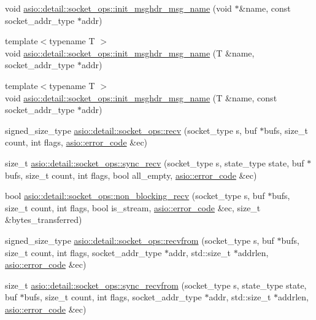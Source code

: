 \begin{DoxyCompactItemize}
\item 
void \hyperlink{namespaceasio_1_1detail_1_1socket__ops_a5ac22aed954e61ebb26ec23e2b3a8e2a}{asio\+::detail\+::socket\+\_\+ops\+::init\+\_\+msghdr\+\_\+msg\+\_\+name} (void $\ast$\&name, const socket\+\_\+addr\+\_\+type $\ast$addr)
\item 
{\footnotesize template$<$typename T $>$ }\\void \hyperlink{namespaceasio_1_1detail_1_1socket__ops_a329d55c68d029e6d969b44477af1be17}{asio\+::detail\+::socket\+\_\+ops\+::init\+\_\+msghdr\+\_\+msg\+\_\+name} (T \&name, socket\+\_\+addr\+\_\+type $\ast$addr)
\item 
{\footnotesize template$<$typename T $>$ }\\void \hyperlink{namespaceasio_1_1detail_1_1socket__ops_a8a41f252aeeef9953d7d8778a805a7f4}{asio\+::detail\+::socket\+\_\+ops\+::init\+\_\+msghdr\+\_\+msg\+\_\+name} (T \&name, const socket\+\_\+addr\+\_\+type $\ast$addr)
\item 
signed\+\_\+size\+\_\+type \hyperlink{namespaceasio_1_1detail_1_1socket__ops_a6a6d856ecb3a3c20a7a92142a0ba9390}{asio\+::detail\+::socket\+\_\+ops\+::recv} (socket\+\_\+type s, buf $\ast$bufs, size\+\_\+t count, int flags, \hyperlink{classasio_1_1error__code}{asio\+::error\+\_\+code} \&ec)
\item 
size\+\_\+t \hyperlink{namespaceasio_1_1detail_1_1socket__ops_a0af2a4601b674348ed084aeb22bc21b1}{asio\+::detail\+::socket\+\_\+ops\+::sync\+\_\+recv} (socket\+\_\+type s, state\+\_\+type state, buf $\ast$bufs, size\+\_\+t count, int flags, bool all\+\_\+empty, \hyperlink{classasio_1_1error__code}{asio\+::error\+\_\+code} \&ec)
\item 
bool \hyperlink{namespaceasio_1_1detail_1_1socket__ops_a185dd0a82b9c2a0dad4b7885b3ceda5f}{asio\+::detail\+::socket\+\_\+ops\+::non\+\_\+blocking\+\_\+recv} (socket\+\_\+type s, buf $\ast$bufs, size\+\_\+t count, int flags, bool is\+\_\+stream, \hyperlink{classasio_1_1error__code}{asio\+::error\+\_\+code} \&ec, size\+\_\+t \&bytes\+\_\+transferred)
\item 
signed\+\_\+size\+\_\+type \hyperlink{namespaceasio_1_1detail_1_1socket__ops_ac0d15ad9965b5f996551e6e5ef6fa0a8}{asio\+::detail\+::socket\+\_\+ops\+::recvfrom} (socket\+\_\+type s, buf $\ast$bufs, size\+\_\+t count, int flags, socket\+\_\+addr\+\_\+type $\ast$addr, std\+::size\+\_\+t $\ast$addrlen, \hyperlink{classasio_1_1error__code}{asio\+::error\+\_\+code} \&ec)
\item 
size\+\_\+t \hyperlink{namespaceasio_1_1detail_1_1socket__ops_a8aa7507316c6ba490a3b4159c34b6840}{asio\+::detail\+::socket\+\_\+ops\+::sync\+\_\+recvfrom} (socket\+\_\+type s, state\+\_\+type state, buf $\ast$bufs, size\+\_\+t count, int flags, socket\+\_\+addr\+\_\+type $\ast$addr, std\+::size\+\_\+t $\ast$addrlen, \hyperlink{classasio_1_1error__code}{asio\+::error\+\_\+code} \&ec)

\end{DoxyCompactItemize}
